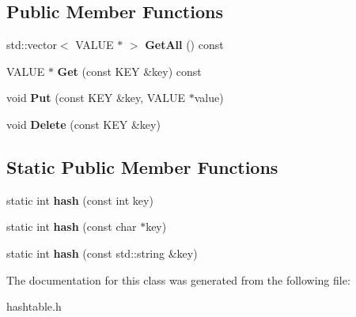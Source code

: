 \subsection*{Public Member Functions}
\begin{DoxyCompactItemize}
\item 
std\+::vector$<$ V\+A\+L\+UE $\ast$ $>$ {\bfseries Get\+All} () const \hypertarget{classHashtable_a7bf91a0bad4df9f656f43819cc022527}{}\label{classHashtable_a7bf91a0bad4df9f656f43819cc022527}

\item 
V\+A\+L\+UE $\ast$ {\bfseries Get} (const K\+EY \&key) const \hypertarget{classHashtable_ace4f7392586e1ef3cf1ffee1ef0e41e1}{}\label{classHashtable_ace4f7392586e1ef3cf1ffee1ef0e41e1}

\item 
void {\bfseries Put} (const K\+EY \&key, V\+A\+L\+UE $\ast$value)\hypertarget{classHashtable_ac53e56e77afab80c98a0ad0ec139d10c}{}\label{classHashtable_ac53e56e77afab80c98a0ad0ec139d10c}

\item 
void {\bfseries Delete} (const K\+EY \&key)\hypertarget{classHashtable_ac870b1fede9f0f044568afadb2407179}{}\label{classHashtable_ac870b1fede9f0f044568afadb2407179}

\end{DoxyCompactItemize}
\subsection*{Static Public Member Functions}
\begin{DoxyCompactItemize}
\item 
static int {\bfseries hash} (const int key)\hypertarget{classHashtable_a0c455c787acfc5ee8ea31c4a858c1a72}{}\label{classHashtable_a0c455c787acfc5ee8ea31c4a858c1a72}

\item 
static int {\bfseries hash} (const char $\ast$key)\hypertarget{classHashtable_ad6dadb3f80f308d7eadfadfe81bf25ac}{}\label{classHashtable_ad6dadb3f80f308d7eadfadfe81bf25ac}

\item 
static int {\bfseries hash} (const std\+::string \&key)\hypertarget{classHashtable_a3dd620df36b8f3d6d44a6090117676d2}{}\label{classHashtable_a3dd620df36b8f3d6d44a6090117676d2}

\end{DoxyCompactItemize}


The documentation for this class was generated from the following file\+:\begin{DoxyCompactItemize}
\item 
hashtable.\+h\end{DoxyCompactItemize}
